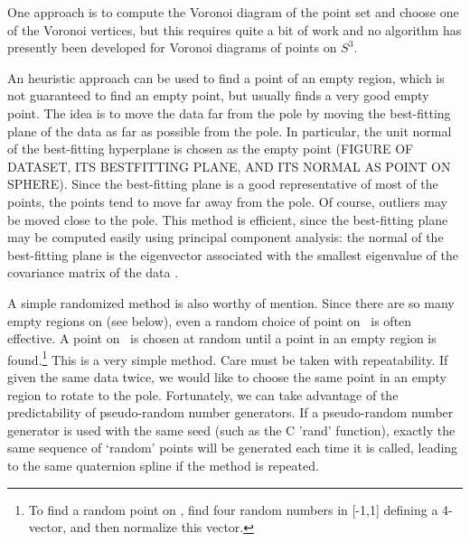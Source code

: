 \documentclass[12pt]{article}
\begin{document}
One approach is to compute the Voronoi diagram of the point set and choose
one of the Voronoi vertices, but this requires quite a bit of work
and no algorithm has presently been developed for Voronoi diagrams 
of points on $S^3$.

An heuristic approach can be used to find a point of an
empty region, which is not guaranteed to find an empty point, 
but usually finds a very good empty point.
The idea is to move the data far from the pole by moving the best-fitting plane
of the data as far as possible from the pole.
In particular, the unit normal of the best-fitting hyperplane 
is chosen as the empty point (FIGURE OF DATASET, ITS BESTFITTING PLANE, AND ITS NORMAL AS POINT ON SPHERE).
Since the best-fitting plane is a good representative of most of the
points, the points tend to move far away from the pole.
Of course, outliers may be moved close to the pole.
This method is efficient, since the best-fitting plane may be computed
easily using principal component analysis:
the normal of the best-fitting plane is the eigenvector associated with the
smallest eigenvalue of the covariance matrix of the data \cite{ballard82}.

A simple randomized method is also worthy of mention.
Since there are so many empty regions on  (see below),
even a random choice of point on \ is often effective.
A point on \ is chosen at random until a point in an empty region 
is found.\footnote{To find a random point on , find four random numbers 
  in [-1,1] defining a 4-vector, and then normalize this vector.}
This is a very simple method.
Care must be taken with repeatability.
If given the same data twice, we would like to choose the same point in an empty region
to rotate to the pole.
Fortunately, we can take advantage of the predictability 
of pseudo-random number generators.
If a pseudo-random number generator is used with the same seed
(such as the C 'rand' function), exactly the same sequence of `random' points will be 
generated each time it is called,
leading to the same quaternion spline if the method is repeated.
\end{document}
